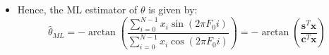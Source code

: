 \begin{itemize}
\[
\sum_{i=0}^{N-1}
x_i \sin(2\pi F_0 i + \theta)
=
\sum_{i=0}^{N-1}
x_i \left[
    \sin(2\pi F_0 i) \cos(\theta)
    + \cos(2\pi F_0 i) \sin(\theta)
\right]
= 0
\]

\[
\sum_{i=0}^{N-1}
x_i \cos(2\pi F_0 i) \sin(\theta)
= -\sum_{i=0}^{N-1}
x_i \sin(2\pi F_0 i) \cos(\theta)
\]

\[
\frac{\sin(\theta)}{\cos(\theta)}
=
-\frac{ \sum_{i=0}^{N-1} x_i \sin(2\pi F_0 i) }
        { \sum_{i=0}^{N-1} x_i \cos(2\pi F_0 i) }
\implies
\theta = -\arctan
\left(
\frac{ \sum_{i=0}^{N-1} x_i \sin(2\pi F_0 i) }
      { \sum_{i=0}^{N-1} x_i \cos(2\pi F_0 i) }
\right)
\]
    \item Hence, the ML estimator of \(\theta\) is given by:
    \[
\hat{\theta}_{ML}
= -\arctan \left(
    \frac{\sum_{i=0}^{N-1} x_i \sin(2\pi F_0 i)}
         {\sum_{i=0}^{N-1} x_i \cos(2\pi F_0 i)}
\right)
= -\arctan \left(
    \frac{ \mathbf{s}^T \mathbf{x} }
         { \mathbf{c}^T \mathbf{x} }
\right)
\]


\end{itemize}
